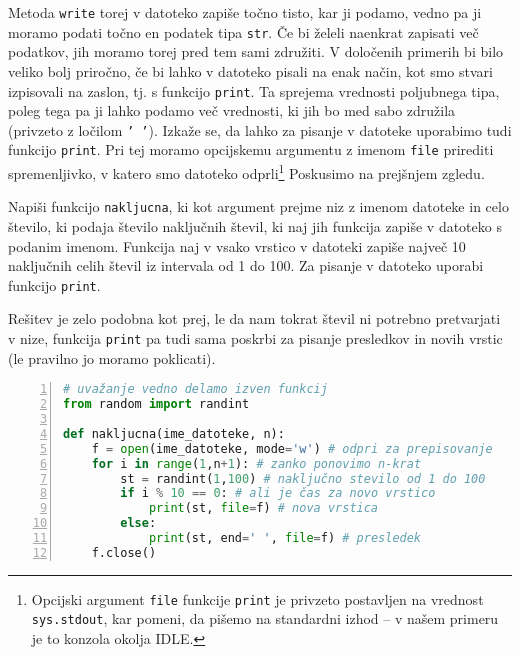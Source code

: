 Metoda \texttt{write} torej v datoteko zapiše točno tisto, kar ji podamo, vedno pa ji moramo podati točno en podatek tipa \texttt{str}. Če bi želeli naenkrat zapisati več podatkov, jih moramo torej pred tem sami združiti. V določenih primerih bi bilo veliko bolj priročno, če bi lahko v datoteko pisali na enak način, kot smo stvari izpisovali na zaslon, tj. s funkcijo \texttt{print}. Ta sprejema vrednosti poljubnega tipa, poleg tega pa ji lahko podamo več vrednosti, ki jih bo med sabo združila (privzeto z ločilom \texttt{' '}). Izkaže se, da lahko za pisanje v datoteke uporabimo tudi funkcijo \texttt{print}. Pri tej moramo opcijskemu argumentu z imenom \texttt{file} prirediti spremenljivko, v katero smo datoteko odprli\footnote{Opcijski argument \texttt{file} funkcije \texttt{print} je privzeto postavljen na vrednost \texttt{sys.stdout}, kar pomeni, da pišemo na standardni izhod -- v našem primeru je to konzola okolja IDLE.} Poskusimo na prejšnjem zgledu.
\begin{zgled}
Napiši funkcijo \texttt{nakljucna}, ki kot argument prejme niz z imenom datoteke in celo število, ki podaja število naključnih števil, ki naj jih funkcija zapiše v datoteko s podanim imenom. Funkcija naj v vsako vrstico v datoteki zapiše največ 10 naključnih celih števil iz intervala od 1 do 100. Za pisanje v datoteko uporabi funkcijo \texttt{print}.
\end{zgled}
\begin{resitev}
Rešitev je zelo podobna kot prej, le da nam tokrat števil ni potrebno pretvarjati v nize, funkcija \texttt{print} pa tudi sama poskrbi za pisanje presledkov in novih vrstic (le pravilno jo moramo poklicati).
\begin{lstlisting}[language=Python, showstringspaces=false,numbers=left]
# uvažanje vedno delamo izven funkcij
from random import randint

def nakljucna(ime_datoteke, n):
    f = open(ime_datoteke, mode='w') # odpri za prepisovanje
    for i in range(1,n+1): # zanko ponovimo n-krat
        st = randint(1,100) # naključno stevilo od 1 do 100
        if i % 10 == 0: # ali je čas za novo vrstico
            print(st, file=f) # nova vrstica
        else:
            print(st, end=' ', file=f) # presledek 
    f.close()
\end{lstlisting}
\end{resitev}

